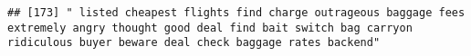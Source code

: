 \documentclass[
]{article}
\begin{document}
\begin{verbatim}
## [173] " listed cheapest flights find charge outrageous baggage fees extremely angry thought good deal find bait switch bag carryon ridiculous buyer beware deal check baggage rates backend"                                                                                                                                                                                                                                                                                                                                                                                                                                                                                                                                                                                                                                                                                                                                                                                                                                                                                                                                                                                                                                                                                                                                                                                                                                                                                                                                                                                                                                                                                                                                                                                                          

\end{verbatim}
\end{document}
